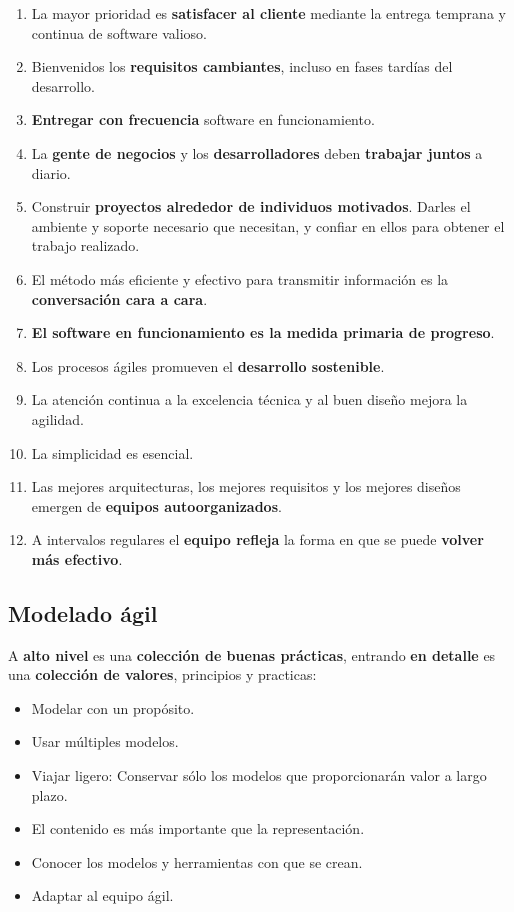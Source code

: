 \begin{enumerate}
    \item La mayor prioridad es \textbf{satisfacer al cliente} mediante la entrega temprana y continua de software valioso.
    \item Bienvenidos los \textbf{requisitos cambiantes}, incluso en fases tardías del desarrollo.
    \item \textbf{Entregar con frecuencia} software en funcionamiento.
    \item La \textbf{gente de negocios} y los \textbf{desarrolladores} deben \textbf{trabajar juntos} a diario. %
    \item Construir \textbf{proyectos alrededor de individuos motivados}. Darles el ambiente y soporte necesario que necesitan, y confiar en ellos para obtener el trabajo realizado. %
    \item El método más eficiente y efectivo para transmitir información es la \textbf{conversación cara a cara}.
    \item \textbf{El software en funcionamiento es la medida primaria de progreso}.
    \item Los procesos ágiles promueven el \textbf{desarrollo sostenible}. %
    \item La atención continua a la excelencia técnica y al buen diseño mejora la agilidad.
    \item La simplicidad es esencial. %
    \item Las mejores arquitecturas, los mejores requisitos y los mejores diseños emergen de \textbf{equipos autoorganizados}.
    \item A intervalos regulares el \textbf{equipo refleja} la forma en que se puede \textbf{volver más efectivo}.
\end{enumerate}

\subsection{Modelado ágil}
A \textbf{alto nivel} es una \textbf{colección de buenas prácticas}, entrando \textbf{en detalle} es una \textbf{colección de valores}, principios y practicas: 
\begin{itemize}
   \item Modelar con un propósito.
   \item Usar múltiples modelos.
   \item Viajar ligero: Conservar sólo los modelos que proporcionarán valor a largo plazo.
   \item El contenido es más importante que la representación.
   \item Conocer los modelos y herramientas con que se crean.
   \item Adaptar al equipo ágil.
\end{itemize}

